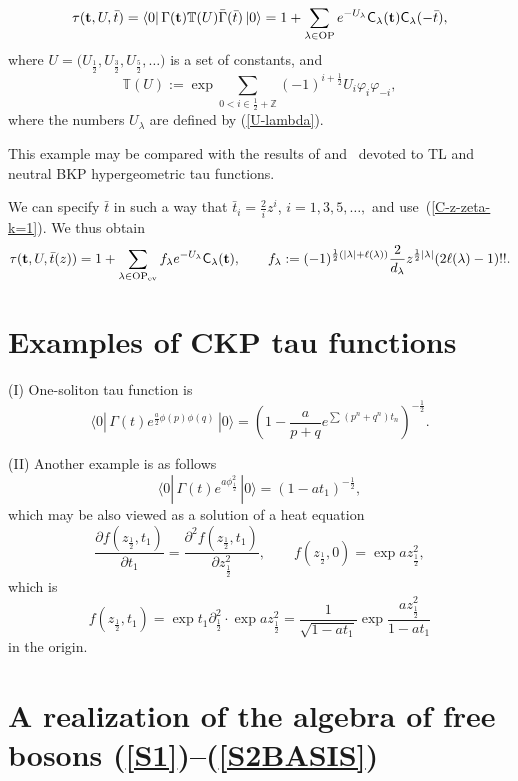 \documentclass[pdftex]{sigma}
\numberwithin{equation}{section}
\newcommand{\G}{\Gamma}
\newcommand{\bt}{{\bf {t}}}
\renewcommand{\l}{\langle}
\renewcommand{\r}{\rangle}
\begin{document}
\begin{example}
\[
\tau(\bt,U,{\bar t})=\l 0|\,\G(\bt)\mathbb{T}(U){\bar \G}({\bar
t})\,|0\r=1+\sum_{\lambda\in
\rm OP} e^{-U_\lambda}\textsf{C}_\lambda(\bt)\textsf{C}_\lambda(-{\bar
t}),
\]
  where $U=\big(U_\frac 12,U_\frac 32,U_\frac 52,\dots\big)$ is a set of
  constants, and
  \[
\mathbb{T}(U)   := \exp \sum_{0< i\in \frac 12 +\mathbb{Z}}
(-1)^{i+\frac 12}U_i\varphi_i\varphi_{-i},
  \]
  where the numbers $U_\lambda$ are def\/ined by (\ref{U-lambda}).

This example may be compared with the results of \cite{pd22} and~\cite{q2} devoted to TL and neutral BKP hypergeometric tau
functions.

We can specify ${\bar t}$ in such a way that ${\bar t}_{i}=\frac
2i z^i$, $i=1,3,5, \dots,$ and use~(\ref{C-z-zeta-k=1}). We thus obtain
\[
\tau(\bt,U,{\bar t}(z))=1+\sum_{\lambda\in {\rm OP}_{\rm ev}} f_\lambda
e^{-U_\lambda}\textsf{C}_\lambda(\bt)  ,\qquad
f_\lambda:=(-1)^{\frac 12(|\lambda|+\ell(\lambda))}\frac
2{d_\lambda} z^{\frac12|\lambda|} (2\ell(\lambda)-1)!!.
\]
\end{example}





\appendix

\section{Examples of CKP tau functions}\label{Examples}

(I) One-soliton tau function is
\[
\l 0|\, \Gamma(t) e^{\frac
a2\phi(p)\phi(q)}\,|0\r = \left(1-\frac{a}{p+q}e^{\sum_{}\left(p^n+q^n
\right)t_n} \right)^{-\frac 12}.
\]

(II) Another example is as follows
\[
\l 0|\, \Gamma(t) e^{ a\phi_{\frac 12}^2}\,|0\r = \left(1-at_1
\right)^{-\frac 12},
\]
 which may be also viewed as a solution of a heat equation
 \[
\frac{\partial f(z_{\frac 12},t_1)}{\partial
{t_1}}=\frac{\partial^2 f(z_{\frac 12},t_1)}{\partial z_{\frac
12}^2} ,\qquad f(z_{\frac 12},0)= \exp  a z_{\frac 12}^2,
 \]
which is
  \[
f(z_{\frac 12},t_1)=\exp t_1\partial^2_{\frac 12}\cdot \exp a
z^2_{\frac 12} = \frac{1}{\sqrt{1-at_1}} \exp \frac{ a z_{\frac
12}^2 } {1-at_1}
  \]
in the origin.


\section[A realization of the algebra of free bosons (\ref{S1})-(\ref{S2BASIS})]{A realization of the algebra of free bosons (\ref{S1})--(\ref{S2BASIS})}\label{Realization}
\end{document}

